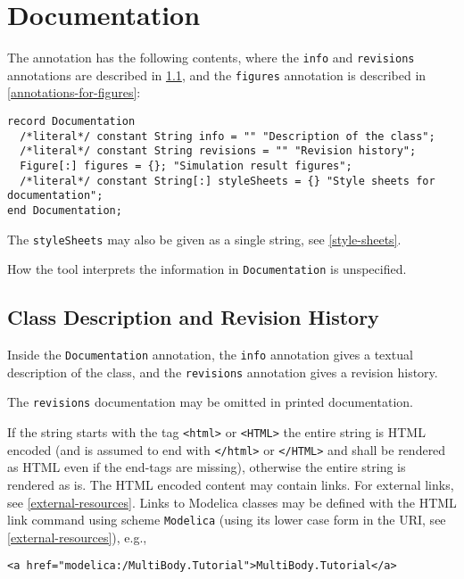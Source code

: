 \section{Documentation}\label{annotations-for-documentation}\label{documentation}

The  annotation has the following contents, where the \lstinline!info! and \lstinline!revisions! annotations are described in \cref{annotation-info-revisions}, and the \lstinline!figures! annotation is described in \cref{annotations-for-figures}:
\begin{lstlisting}[language=modelica]
record Documentation
  /*literal*/ constant String info = "" "Description of the class";
  /*literal*/ constant String revisions = "" "Revision history";
  Figure[:] figures = {}; "Simulation result figures";
  /*literal*/ constant String[:] styleSheets = {} "Style sheets for documentation";
end Documentation;
\end{lstlisting}

The \lstinline!styleSheets! may also be given as a single string, see \cref{style-sheets}.

How the tool interprets the information in \lstinline!Documentation! is unspecified.

\subsection{Class Description and Revision History}\label{annotation-info-revisions}

Inside the \lstinline!Documentation! annotation, the \lstinline!info! annotation gives a textual description of the class, and the \lstinline!revisions! annotation gives a revision history.

\begin{nonnormative}
The \lstinline!revisions! documentation may be omitted in printed documentation.
\end{nonnormative}

If the string starts with the tag \lstinline!<html>! or \lstinline!<HTML>! the entire string is HTML encoded (and is assumed to end with \lstinline!</html>! or \lstinline!</HTML>! and shall be rendered as HTML even if the end-tags are missing), otherwise the entire string is rendered as is.
The HTML encoded content may contain links.
For external links, see \cref{external-resources}.
Links to Modelica classes may be defined with the HTML link command using scheme \lstinline!Modelica! (using its lower case form in the URI, see \cref{external-resources}), e.g.,
\begin{lstlisting}[language=modelica]
<a href="modelica:/MultiBody.Tutorial">MultiBody.Tutorial</a>
\end{lstlisting}

